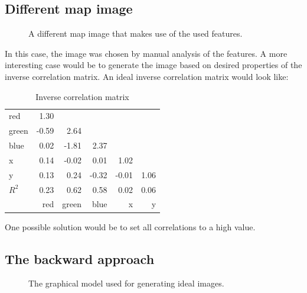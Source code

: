 \documentclass{article}
\begin{document}
\subsection{Different map image}

\begin{figure}[h]
  \centering
  \caption{A different map image that makes use of the used features.}
  \label{fig:newmap}
\end{figure}

In this case, the image was chosen by manual analysis of the
features. A more interesting case would be to generate the image based
on desired properties of the inverse correlation matrix. 
An ideal inverse correlation matrix would look like:

\begin{table}                                   
\centering                                      
\begin{tabular}{l|rrrrr}                    
    red   & 1.30  &       &       &       &      \\  
    green & -0.59 & 2.64  &       &       &      \\
    blue  & 0.02  & -1.81 & 2.37  &       &      \\ 
    x     & 0.14  & -0.02 & 0.01  & 1.02  &      \\ 
    y     & 0.13  & 0.24  & -0.32 & -0.01 & 1.06 \\ 
  \midrule
  $R^2$   & 0.23  & 0.62  & 0.58  & 0.02  & 0.06 \\
  \midrule
          & red   & green & blue  & x     & y
\end{tabular}                                   
\caption{Inverse correlation matrix}                        
\label{table:MyTableLabel}                      
\end{table} 


One possible solution would be to set all correlations to a high
value.

\subsection{The backward approach}

\begin{figure}[h]
  \centering
  \caption{The graphical model used for generating ideal images.}
\end{figure}
\end{document}
